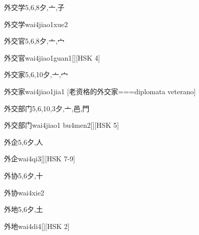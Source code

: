 \begin{Entry}{外交学}{5,6,8}{⼣,⼇,⼦}
  \begin{Phonetics}{外交学}{wai4jiao1xue2}
  \end{Phonetics}
\end{Entry}

\begin{Entry}{外交官}{5,6,8}{⼣,⼇,⼧}
  \begin{Phonetics}{外交官}{wai4jiao1guan1}[][HSK 4]
  \end{Phonetics}
\end{Entry}

\begin{Entry}{外交家}{5,6,10}{⼣,⼇,⼧}
  \begin{Phonetics}{外交家}{wai4jiao1jia1}
    [老资格的外交家===diplomata veterano]
  \end{Phonetics}
\end{Entry}

\begin{Entry}{外交部门}{5,6,10,3}{⼣,⼇,⾢,⾨}
  \begin{Phonetics}{外交部门}{wai4jiao1 bu4men2}[][HSK 5]
  \end{Phonetics}
\end{Entry}

\begin{Entry}{外企}{5,6}{⼣,⼈}
  \begin{Phonetics}{外企}{wai4qi3}[][HSK 7-9]
  \end{Phonetics}
\end{Entry}

\begin{Entry}{外协}{5,6}{⼣,⼗}
  \begin{Phonetics}{外协}{wai4xie2}
  \end{Phonetics}
\end{Entry}

\begin{Entry}{外地}{5,6}{⼣,⼟}
  \begin{Phonetics}{外地}{wai4di4}[][HSK 2]
  \end{Phonetics}
\end{Entry}

